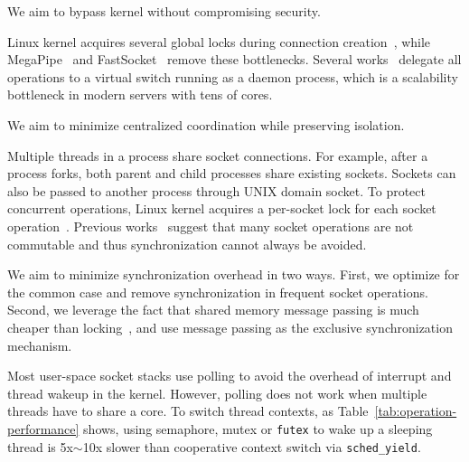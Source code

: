 We aim to bypass kernel without compromising security.


Linux kernel acquires several global locks during connection creation~\cite{boyd2010analysis}, while MegaPipe~\cite{han2012megapipe} and FastSocket~\cite{lin2016scalable} remove these bottlenecks.
Several works~\cite{martins2014clickos,roghanchi2017ffwd,huang2017high,freeflow} delegate all operations to a virtual switch running as a daemon process, which is a scalability bottleneck in modern servers with tens of cores.

We aim to minimize centralized coordination while preserving isolation.

Multiple threads in a process share socket connections.
For example, after a process forks, both parent and child processes share existing sockets.
Sockets can also be passed to another process through UNIX domain socket.
To protect concurrent operations, Linux kernel acquires a per-socket lock for each socket operation~\cite{boyd2010analysis,han2012megapipe,lin2016scalable}.
Previous works~\cite{boyd2010analysis,clements2015scalable} suggest that many socket operations are not commutable and thus synchronization cannot always be avoided.

We aim to minimize synchronization overhead in two ways.
First, we optimize for the common case and remove synchronization in frequent socket operations.
Second, we leverage the fact that shared memory message passing is much cheaper than locking~\cite{roghanchi2017ffwd}, and use message passing as the exclusive synchronization mechanism.


Most user-space socket stacks use polling to avoid the overhead of interrupt and thread wakeup in the kernel.
However, polling does not work when multiple threads have to share a core.
To switch thread contexts, as Table~\ref{tab:operation-performance} shows, using semaphore, mutex or \texttt{futex} to wake up a sleeping thread is 5x$\sim$10x slower than cooperative context switch via \texttt{sched\_yield}.

